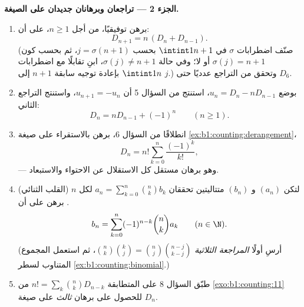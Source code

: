 \begin{problem}
\medskip
\noindent\textbf{الجزء 2 --- تراجعان وبرهانان جديدان على
الصيغة.}
\begin{enumerate}[resume]
  \item برهن توفيقيًا، من أجل $n \geq 1$، على أن:
        \[
        D_{n+1} = n\,(D_n + D_{n-1}) .
        \]
        (صنّف اضطرابات $\sigma$ في $\intint1{n+1}$ بحسب
        $j = \sigma(n+1)$، ثم بحسب كون $\sigma(j) = n + 1$ أو
        لا؛ وفي حالة $\sigma(j) \neq n+1$، ابنِ تقابلًا مع
        اضطرابات $\intint1n$ بإعادة توجيه سابقة
        $n + 1$ إلى $j$.) وتحقق من التراجع عدديًا حتى
        $D_6$.
  \item بوضع $u_n = D_n - n D_{n-1}$، استنتج من السؤال 5
        أن $u_{n+1} = -u_n$، واستنتج التراجع الثاني:
        \[
        D_n = n D_{n-1} + (-1)^n \qquad (n \geq 1).
        \]
  \item انطلاقًا من السؤال 6، برهن بالاستقراء على صيغة
        \cref{ex:b1:counting:derangement}،
        \[
        D_n = n! \sum_{k=0}^{n} \frac{(-1)^k}{k!},
        \]
        --- وهو برهان مستقل كل الاستقلال عن الاحتواء والاستبعاد.
  \item (القلب الثنائي) لتكن $(a_n)$ و $(b_n)$ متتاليتين
        تحققان $a_n = \sum_{k=0}^n \binom nk b_k$ لكل
        $n$. برهن على أن
        \[
        b_n = \sum_{k=0}^{n} (-1)^{n-k} \binom nk a_k
        \qquad (n \in \N).
        \]
        (أرسِ أولًا \emph{المراجعة الثلاثية}
        $\binom nk \binom kj = \binom nj \binom{n-j}{k-j}$، ثم
        استعمل المجموع المتناوب لسطر
        \cref{ex:b1:counting:binomial}.)
  \item طبّق السؤال 8 على المتطابقة $n! = \sum_k \binom nk
        D_{n-k}$ من \cref{exo:b1:counting:11} للحصول على برهان
        \emph{ثالث} على صيغة $D_n$.
\end{enumerate}


\end{problem}
